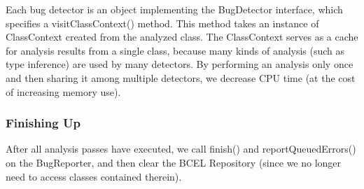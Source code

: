 \documentclass[11pt]{article}
\begin{document}
Each bug detector is an object implementing the BugDetector interface,
which specifies a visitClassContext() method.  This method takes
an instance of ClassContext created from the analyzed class.  The ClassContext serves
as a cache for analysis results from a single class, because many
kinds of analysis (such as type inference) are used by many detectors.
By performing an analysis only once and then sharing it among multiple
detectors, we decrease CPU time (at the cost of increasing memory use).

\subsubsection{Finishing Up}

After all analysis passes have executed, we call finish() and
reportQueuedErrors() on the BugReporter, and then clear the BCEL Repository
(since we no longer need to access classes contained therein).
\end{document}
